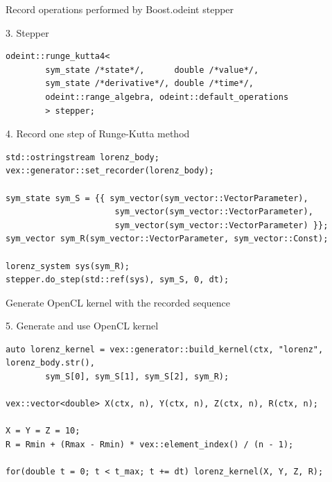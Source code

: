 \documentclass[@BEAMER_OPTIONS@]{beamer}
\begin{document}
\begin{frame}[fragile]{Record operations performed by Boost.odeint stepper}
    \begin{exampleblock}{3. Stepper}
        \begin{lstlisting}[firstnumber=last]
odeint::runge_kutta4<
        sym_state /*state*/,      double /*value*/,
        sym_state /*derivative*/, double /*time*/,
        odeint::range_algebra, odeint::default_operations
        > stepper;
        \end{lstlisting}
    \end{exampleblock}

    \begin{exampleblock}{4. Record one step of Runge-Kutta method}
        \begin{lstlisting}[firstnumber=last]
std::ostringstream lorenz_body;
vex::generator::set_recorder(lorenz_body);

sym_state sym_S = {{ sym_vector(sym_vector::VectorParameter),
                      sym_vector(sym_vector::VectorParameter),
                      sym_vector(sym_vector::VectorParameter) }};
sym_vector sym_R(sym_vector::VectorParameter, sym_vector::Const);

lorenz_system sys(sym_R);
stepper.do_step(std::ref(sys), sym_S, 0, dt);
        \end{lstlisting}
    \end{exampleblock}
\end{frame}


\begin{frame}[fragile]{Generate OpenCL kernel with the recorded sequence}
    \begin{exampleblock}{5. Generate and use OpenCL kernel}
        \begin{lstlisting}[firstnumber=last]
auto lorenz_kernel = vex::generator::build_kernel(ctx, "lorenz", lorenz_body.str(),
        sym_S[0], sym_S[1], sym_S[2], sym_R);

vex::vector<double> X(ctx, n), Y(ctx, n), Z(ctx, n), R(ctx, n);

X = Y = Z = 10;
R = Rmin + (Rmax - Rmin) * vex::element_index() / (n - 1);

for(double t = 0; t < t_max; t += dt) lorenz_kernel(X, Y, Z, R);
        \end{lstlisting}
    \end{exampleblock}
\end{frame}
\end{document}
